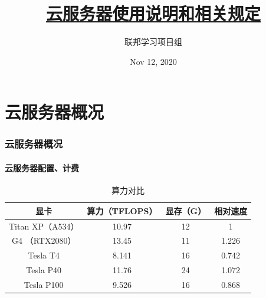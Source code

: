 \documentclass[10pt]{beamer}
\title{
    \href{https://github.com/Ls-Dai/Cloud-Sever-Tutorial}{云服务器使用说明和相关规定}
}
\author{联邦学习项目组}
\date{Nov 12, 2020}
\begin{document}
    \maketitle
    \hypersetup{colorlinks,linkcolor=yellow,urlcolor=yellow}

    \section{云服务器概况}
        \begin{frame}
            \frametitle{云服务器概况}
                \framesubtitle{云服务器配置、计费}

                {\small
                \begin{table}[h]
                    \centering
                    \caption{算力对比}
                        \begin{tabular}{|c|c|c|c|}
                            \hline
                            显卡 & 算力（TFLOPS） & 显存（G） & 相对速度 \\
                            \hline
                            Titan XP（A534） & 10.97 & 12 & 1 \\
                            \hline
                            G4 （RTX2080） & 13.45 & 11 & 1.226 \\
                            \hline
                            Tesla T4 & 8.141 & 16 & 0.742 \\
                            \hline
                            Tesla P40 & 11.76 & 24 & 1.072 \\
                            \hline
                            Tesla P100 & 9.526 & 16 & 0.868 \\
                            \hline
                        \end{tabular}
                \end{table}
                }

        \end{frame}

        \hypersetup{colorlinks,linkcolor=yellow,urlcolor=blue}
\end{document}
